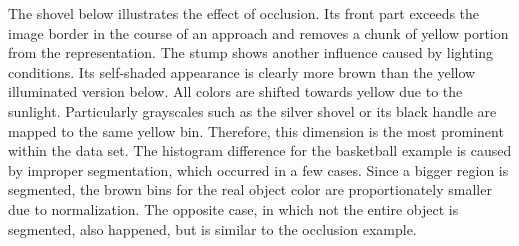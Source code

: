 \documentclass[conference]{IEEEtran}
\begin{document}
The shovel below illustrates the effect of occlusion. Its front part exceeds the image border in the course of an approach and removes a chunk of yellow portion 
from the representation. The stump shows another influence caused by lighting conditions. Its self-shaded appearance is clearly 
more brown than the yellow illuminated version below. All colors are shifted towards yellow due to the sunlight. Particularly grayscales such as the silver shovel or 
its black handle are mapped to the same yellow bin. 
Therefore, this dimension is the most prominent within the data set. 
The histogram difference for the basketball example is caused by improper segmentation, which occurred in a few cases. Since a bigger region is segmented,
the brown bins for the real object color are proportionately smaller due to normalization. The opposite case, in which not the entire object is segmented, also happened, but is similar to 
the occlusion example.\\
\end{document}
